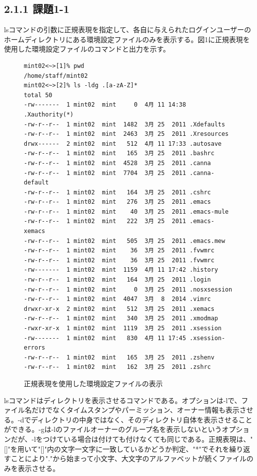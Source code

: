 \documentclass[12pt]{jreport}
\begin{document}
            \subsection*{2.1.1 課題1-1}
                lsコマンドの引数に正規表現を指定して、各自に与えられたログインユーザーのホームディレクトリにある環境設定ファイルのみを表示する。図1に正規表現を使用した環境設定ファイルのコマンドと出力を示す。
                \begin{figure}[H]
                    \begin{center}
                        \begin{screen}
                            \begin{verbatim}
mint02<~>[1]% pwd
/home/staff/mint02
mint02<~>[2]% ls -ldg .[a-zA-Z]*
total 50
-rw-------  1 mint02  mint     0  4月 11 14:38 .Xauthority(*)
-rw-r--r--  1 mint02  mint  1482  3月 25  2011 .Xdefaults
-rw-r--r--  1 mint02  mint  2463  3月 25  2011 .Xresources
drwx------  2 mint02  mint   512  4月 11 17:33 .autosave
-rw-r--r--  1 mint02  mint   165  3月 25  2011 .bashrc
-rw-r--r--  1 mint02  mint  4528  3月 25  2011 .canna
-rw-r--r--  1 mint02  mint  7704  3月 25  2011 .canna-default
-rw-r--r--  1 mint02  mint   164  3月 25  2011 .cshrc
-rw-r--r--  1 mint02  mint   276  3月 25  2011 .emacs
-rw-r--r--  1 mint02  mint    40  3月 25  2011 .emacs-mule
-rw-r--r--  1 mint02  mint   222  3月 25  2011 .emacs-xemacs
-rw-r--r--  1 mint02  mint   505  3月 25  2011 .emacs.mew
-rw-r--r--  1 mint02  mint    36  3月 25  2011 .fvwmrc
-rw-r--r--  1 mint02  mint    36  3月 25  2011 .fvwmrc
-rw-------  1 mint02  mint  1159  4月 11 17:42 .history
-rw-r--r--  1 mint02  mint   164  3月 25  2011 .login
-rw-r--r--  1 mint02  mint     0  3月 25  2011 .nosxsession
-rw-r--r--  1 mint02  mint  4047  3月  8  2014 .vimrc
drwxr-xr-x  2 mint02  mint   512  3月 25  2011 .xemacs
-rw-r--r--  1 mint02  mint   340  3月 25  2011 .xmodmap
-rwxr-xr-x  1 mint02  mint  1119  3月 25  2011 .xsession
-rw-------  1 mint02  mint   830  4月 11 17:45 .xsession-errors
-rw-r--r--  1 mint02  mint   165  3月 25  2011 .zshenv
-rw-r--r--  1 mint02  mint   162  3月 25  2011 .zshrc
                            \end{verbatim}
                        \end{screen}
                        \caption{正規表現を使用した環境設定ファイルの表示}
                        \label{1}
                    \end{center}
                \end{figure}
            lsコマンドはディレクトリを表示させるコマンドである。オプションは-lで、ファイル名だけでなくタイムスタンプやパーミッション、オーナー情報も表示させる。-dでディレクトリの中身ではなく、そのディレクトリ自体を表示させることができる。-gは-lのファイルオーナーのグループ名を表示しないというオプションだが、-lをつけている場合は付けても付けなくても同じである。正規表現は、"[]"を用いて"[]"内の文字一文字に一致しているかどうか判定、"*"でそれを繰り返すことにより"."から始まって小文字、大文字のアルファベットが続くファイルのみを表示させる。
\end{document}
